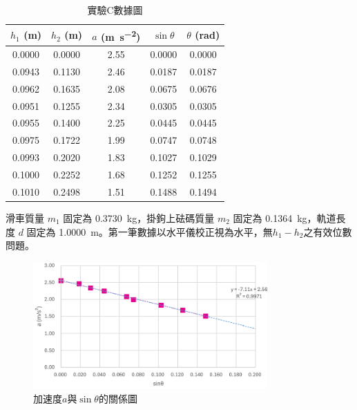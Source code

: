 \documentclass[11pt,a4paper]{article}
\theoremstyle{definition}
\begin{document}
            \begin{table}[H]
                \centering
                \caption{實驗C數據圖}
                \label{tab:expC_data}
                \begin{tabular}{|c|c|c|c|c|}
                    \hline
                    $h_1$ (\si{\meter}) & $h_2$ (\si{\meter}) & $a$ (\si{\meter\per\second\squared}) & $\sin\theta$ & $\theta$ (\si{\radian}) \\
                    \hline
                    0.0000 & 0.0000 & 2.55 & 0.0000 & 0.0000 \\ \hline
                    0.0943 & 0.1130 & 2.46 & 0.0187 & 0.0187 \\ \hline
                    0.0962 & 0.1635 & 2.08 & 0.0675 & 0.0676 \\ \hline
                    0.0951 & 0.1255 & 2.34 & 0.0305 & 0.0305 \\ \hline
                    0.0955 & 0.1400 & 2.25 & 0.0445 & 0.0445 \\ \hline
                    0.0975 & 0.1722 & 1.99 & 0.0747 & 0.0748 \\ \hline
                    0.0993 & 0.2020 & 1.83 & 0.1027 & 0.1029 \\ \hline
                    0.1000 & 0.2252 & 1.68 & 0.1252 & 0.1255 \\ \hline
                    0.1010 & 0.2498 & 1.51 & 0.1488 & 0.1494 \\ \hline
                \end{tabular}
            \end{table}
            滑車質量 $m_1$ 固定為 \SI{0.3730}{\kilogram}，掛鉤上砝碼質量 $m_2$ 固定為 \SI{0.1364}{\kilogram}，軌道長度 $d$ 固定為 \SI{1.0000}{\meter}。第一筆數據以水平儀校正視為水平，無$h_1 - h_2$之有效位數問題。

            \begin{figure}[H]
                
                \centering
                \includegraphics[width=0.8\textwidth]{實驗C數據圖1.png}
                \caption{加速度$a$與$\sin\theta$的關係圖
                }
                \label{fig:實驗C數據圖1}

            \end{figure}
\end{document}
